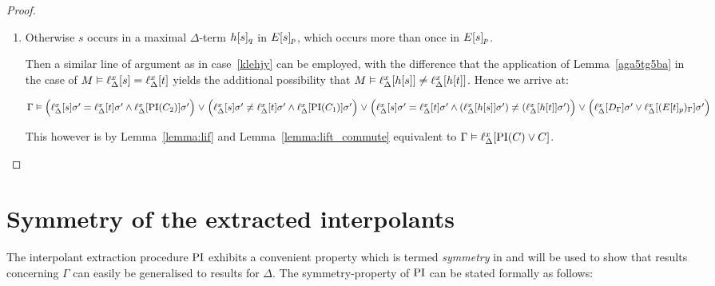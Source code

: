 \begin{proof}
\begin{description}
\begin{enumerate}
				\item Otherwise $s$ occurs in a maximal $\Delta$-term $h{[s]_{q}}$ in $E{[s]_{p}}$, which occurs more than once in $E{[s]_{p}}$.

					Then a similar line of argument as in case~\ref{klehjy} can be employed, with the difference that the application of Lemma~\ref{aga5tg5ba} in the case of $M\vDash \ell_{\Delta}^{x}[s] = \ell_{\Delta}^{x}[t]$ yields the additional possibility that 
					$M\vDash \ell_{\Delta}^{x}[h[s]] \neq \ell_{\Delta}^{x}[h[t]]$.
					Hence we arrive at:

					$\Gamma \vDash
					\Big(\ell_{\Delta}^{x}[s]\sigma'=\ell_{\Delta}^{x}[t]\sigma' \land \ell_{\Delta}^{x}[\operatorname{PI}(C_2)]\sigma'\Big) \;{\lor}\;\allowbreak
					\Big(\ell_{\Delta}^{x}[s]\sigma'\neq\ell_{\Delta}^{x}[t]\sigma' \land \ell_{\Delta}^{x}[\operatorname{PI}(C_1)]\sigma'\Big) \;{\lor}\;\allowbreak
					\Big(\ell_{\Delta}^{x}[s]\sigma'=\ell_{\Delta}^{x}[t]\sigma' \land (\ell_{\Delta}^{x}[h[s]]\sigma') \neq (\ell_{\Delta}^{x}[h[t]]\sigma' )\Big) \;{\lor}\;\allowbreak
					\Big(\ell_{\Delta}^{x}[D_\Gamma]\sigma' \lor \ell_{\Delta}^{x}[(E{[t]_{p}})_\Gamma]\sigma'\Big)$

					This however is by Lemma~\ref{lemma:lif} and Lemma~\ref{lemma:lift_commute} equivalent to $\Gamma \entails \lifdelta{\PI(C) \lor\nolinebreak C}$.
					\qedhere
			\end{enumerate}
	\end{description}
\end{proof}


\section{Symmetry of the extracted interpolants}
\label{sec:symmetry}


The interpolant extraction procedure $\operatorname{PI}$ exhibits a convenient property which is termed \emph{symmetry} in \cite[Definition 5]{interpolantStrenth} and will be used to show that results concerning $\Gamma$ can easily be generalised to results for $\Delta$.
The symmetry-property of $\operatorname{PI}$ can be stated formally as follows:

